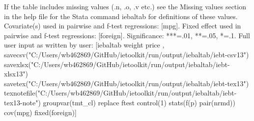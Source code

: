 If the table includes missing values (.n, .o, .v etc.) see the Missing values section in the help file for the Stata command iebaltab for definitions of these values. Covariate(s) used in pairwise and f-test regressions: [mpg]. Fixed effect used in pairwise and f-test regressions: [foreign]. Significance: ***=.01, **=.05, *=.1. Full user input as written by user: [iebaltab weight price , savecsv("C:/Users/wb462869/GitHub/ietoolkit/run/output/iebaltab/iebt-csv13") savexlsx("C:/Users/wb462869/GitHub/ietoolkit/run/output/iebaltab/iebt-xlsx13") savetex("C:/Users/wb462869/GitHub/ietoolkit/run/output/iebaltab/iebt-tex13") texnotefile("C:/Users/wb462869/GitHub/ietoolkit/run/output/iebaltab/iebt-tex13-note") groupvar(tmt\_cl) replace ftest control(1) stats(f(p) pair(nrmd)) cov(mpg) fixed(foreign)] 

